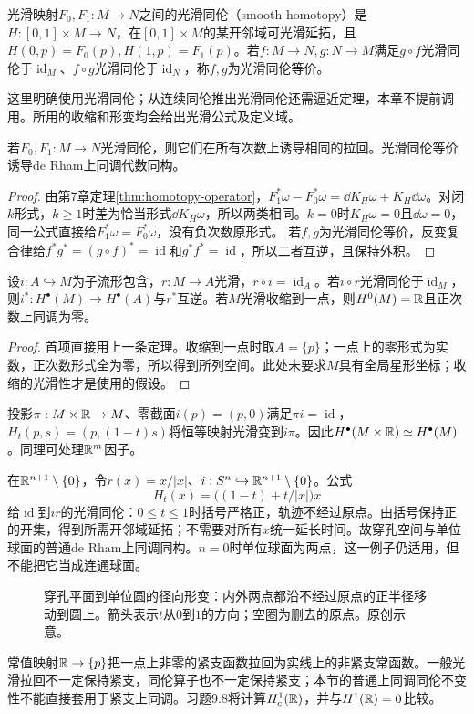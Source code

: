 \begin{definition}[光滑同伦与光滑同伦等价]
光滑映射$F_0,F_1:M\to N$之间的光滑同伦（smooth homotopy）是$H:[0,1]\times M\to N$，在$[0,1]\times M$的某开邻域可光滑延拓，且$H(0,p)=F_0(p),H(1,p)=F_1(p)$。若$f:M\to N,g:N\to M$满足$g\circ f$光滑同伦于$\operatorname{id}_M$、$f\circ g$光滑同伦于$\operatorname{id}_N$，称$f,g$为光滑同伦等价。
\end{definition}
这里明确使用光滑同伦；从连续同伦推出光滑同伦还需逼近定理，本章不提前调用。所用的收缩和形变均会给出光滑公式及定义域。

\begin{theorem}[光滑同伦不变性]\label{thm:cohomology-homotopy}
若$F_0,F_1:M\to N$光滑同伦，则它们在所有次数上诱导相同的拉回。光滑同伦等价诱导de Rham上同调代数同构。
\end{theorem}
\begin{proof}
由第7章定理\ref{thm:homotopy-operator}，$F_1^*\omega-F_0^*\omega=\dd K_H\omega+K_H\dd\omega$。对闭$k$形式，$k\geq1$时差为恰当形式$\dd K_H\omega$，所以两类相同。$k=0$时$K_H\omega=0$且$\dd\omega=0$，同一公式直接给$F_1^*\omega=F_0^*\omega$，没有负次数原形式。
若$f,g$为光滑同伦等价，反变复合律给$f^*g^*=(g\circ f)^*=\operatorname{id}$和$g^*f^*=\operatorname{id}$，所以二者互逆，且保持外积。
\end{proof}

\begin{corollary}[光滑形变收缩]\label{cor:deformation-retract}
设$i:A\hookrightarrow M$为子流形包含，$r:M\to A$光滑，$r\circ i=\operatorname{id}_A$。若$i\circ r$光滑同伦于$\operatorname{id}_M$，则$i^*:H^\bullet(M)\to H^\bullet(A)$与$r^*$互逆。若$M$光滑收缩到一点，则$H^0(M)=\mathbb{R}$且正次数上同调为零。
\end{corollary}
\begin{proof}
首项直接用上一条定理。收缩到一点时取$A=\{p\}$；一点上的零形式为实数，正次数形式全为零，所以得到所列空间。此处未要求$M$具有全局星形坐标；收缩的光滑性才是使用的假设。
\end{proof}

\begin{example}[乘实线与径向形变]\label{ex:radial-retract}
投影$\pi:M\times\mathbb{R}\to M$、零截面$i(p)=(p,0)$满足$\pi i=\operatorname{id}$，$H_t(p,s)=(p,(1-t)s)$将恒等映射光滑变到$i\pi$。因此$H^\bullet(M\times\mathbb{R})\simeq H^\bullet(M)$。同理可处理$\mathbb{R}^m$因子。

在$\mathbb{R}^{n+1}\setminus\{0\}$，令$r(x)=x/|x|$、$i:S^n\hookrightarrow\mathbb{R}^{n+1}\setminus\{0\}$。公式
\[
 H_t(x)=\bigl((1-t)+t/|x|\bigr)x
\]
给$\operatorname{id}$到$ir$的光滑同伦：$0\leq t\leq1$时括号严格正，轨迹不经过原点。由括号保持正的开集，得到所需开邻域延拓；不需要对所有$x$统一延长时间。故穿孔空间与单位球面的普通de Rham上同调同构。$n=0$时单位球面为两点，这一例子仍适用，但不能把它当成连通球面。
\end{example}
\begin{figure}[htbp]
\centering
\caption{穿孔平面到单位圆的径向形变：内外两点都沿不经过原点的正半径移动到圆上。箭头表示$t$从$0$到$1$的方向；空圈为删去的原点。原创示意。}
\label{fig:radial-retract}
\end{figure}

\begin{example}[紧支条件不能自动传递]
常值映射$\mathbb{R}\to\{p\}$把一点上非零的紧支函数拉回为实线上的非紧支常函数。一般光滑拉回不一定保持紧支，同伦算子也不一定保持紧支；本节的普通上同调同伦不变性不能直接套用于紧支上同调。习题9.8将计算$H_c^1(\mathbb{R})$，并与$H^1(\mathbb{R})=0$比较。
\end{example}
